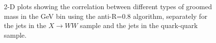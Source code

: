 \begin{figure}
\begin{center}
\caption{2-D plots showing the correlation between different types of
  groomed mass in the  GeV bin using the anti-\kT R=0.8
  algorithm, separately for the jets in the $X \rightarrow WW$ sample and the
  jets in the quark-quark sample.}
\label{fig:pt500_2d_massQQ_AKt_R08}
\end{center}
\end{figure}

